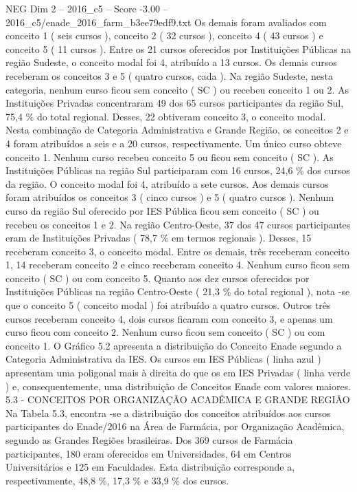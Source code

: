 \begin{textsample}{NEG Dim 2 – 2016\_c5 – Score -3.00 – 2016\_c5/enade\_2016\_farm\_b3ee79edf9.txt}
Os demais foram avaliados com conceito 1 ( seis cursos ), conceito 2 ( 32 cursos ), conceito 4 ( 43 cursos ) e conceito 5 ( 11 cursos ).
Entre os 21 cursos oferecidos por Instituições Públicas na região Sudeste, o conceito modal foi 4, atribuído a 13 cursos.
Os demais cursos receberam os conceitos 3 e 5 ( quatro cursos, cada ).
Na região Sudeste, nesta categoria, nenhum curso ficou sem conceito ( SC ) ou recebeu conceito 1 ou 2.
As Instituições Privadas concentraram 49 dos 65 cursos participantes da região Sul, 75,4 \% do total regional.
Desses, 22 obtiveram conceito 3, o conceito modal.
Nesta combinação de Categoria Administrativa e Grande Região, os conceitos 2 e 4 foram atribuídos a seis e a 20 cursos, respectivamente.
Um único curso obteve conceito 1.
Nenhum curso recebeu conceito 5 ou ficou sem conceito ( SC ).
As Instituições Públicas na região Sul participaram com 16 cursos, 24,6 \% dos cursos da região.
O conceito modal foi 4, atribuído a sete cursos.
Aos demais cursos foram atribuídos os conceitos 3 ( cinco cursos ) e 5 ( quatro cursos ).
Nenhum curso da região Sul oferecido por IES Pública ficou sem conceito ( SC ) ou recebeu os conceitos 1 e 2.
Na região Centro-Oeste, 37 dos 47 cursos participantes eram de Instituições Privadas ( 78,7 \% em termos regionais ).
Desses, 15 receberam conceito 3, o conceito modal.
Entre os demais, três receberam conceito 1, 14 receberam conceito 2 e cinco receberam conceito 4.
Nenhum curso ficou sem conceito ( SC ) ou com conceito 5.
Quanto aos dez cursos oferecidos por Instituições Públicas na região Centro-Oeste ( 21,3 \% do total regional ), nota -se que o conceito 5 ( conceito modal ) foi atribuído a quatro cursos.
Outros três cursos receberam conceito 4, dois cursos ficaram com conceito 3, e apenas um curso ficou com conceito 2.
Nenhum curso ficou sem conceito ( SC ) ou com conceito 1.
O Gráfico 5.2 apresenta a distribuição do Conceito Enade segundo a Categoria Administrativa da IES.
Os cursos em IES Públicas ( linha azul ) apresentam uma poligonal mais à direita do que os em IES Privadas ( linha verde ) e, consequentemente, uma distribuição de Conceitos Enade com valores maiores. 5.3 - CONCEITOS POR ORGANIZAÇÃO ACADÊMICA E GRANDE REGIÃO Na Tabela 5.3, encontra -se a distribuição dos conceitos atribuídos aos cursos participantes do Enade/2016 na Área de Farmácia, por Organização Acadêmica, segundo as Grandes Regiões brasileiras.
Dos 369 cursos de Farmácia participantes, 180 eram oferecidos em Universidades, 64 em Centros Universitários e 125 em Faculdades.
Esta distribuição corresponde a, respectivamente, 48,8 \%, 17,3 \% e 33,9 \% dos cursos.

\end{textsample}
